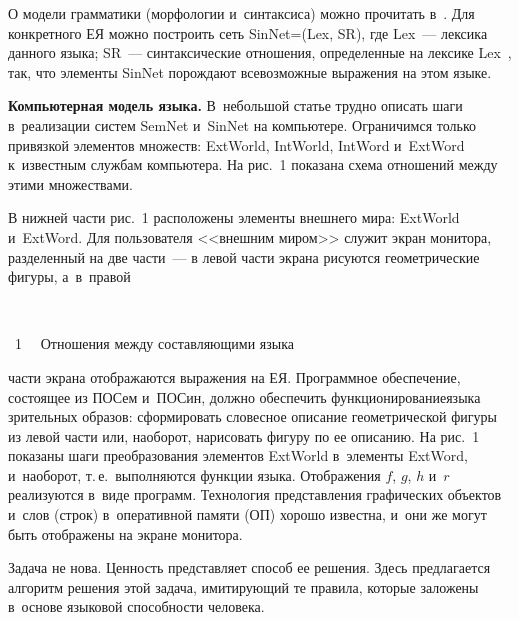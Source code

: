 \begin{multicols}{2}
  О модели грамматики (морфологии и~синтаксиса) можно прочитать 
в~\cite{2-sh, 5-sh}. Для конкретного ЕЯ можно по\-стро\-ить сеть 
SinNet\;=\;(Lex, SR), где Lex~--- лек\-си\-ка данного языка; SR~--- 
синтаксические отношения, определенные на лек\-си\-ке Lex~\cite{6-sh}, так, 
что элементы SinNet по\-рож\-да\-ют все\-воз\-мож\-ные выражения на этом языке. 
  
  \textbf{Компьютерная модель языка.} В~небольшой статье трудно 
описать шаги в~реализации систем SemNet и~SinNet на компьютере. 
Ограничимся только при\-вяз\-кой элементов множеств: ExtWorld, IntWorld, 
IntWord и~ExtWord к~известным служ\-бам компьютера. На рис.~1 показана 
схема отношений между этими множествами.


          
      
  В нижней части рис.~1 расположены элементы внеш\-не\-го мира: ExtWorld и~ExtWord. 
  Для пользователя <<внешним миром>> служит экран 
монитора, разделенный на две час\-ти~--- в левой час\-ти экрана рисуются 
геометрические фигуры, а~в~правой\linebreak\vspace*{-12pt}

{ \begin{center}  %
 \vspace*{12pt}
   \mbox{%
\epsfxsize=79mm
}

\vspace*{6pt}

\noindent
{{\figurename~1}\ \ \small{
Отношения между составляющими языка
}}
\end{center}
}

     
     
     \noindent
      час\-ти экрана отображаются 
выражения на ЕЯ. Про\-грам\-мное обеспечение, со\-сто\-ящее из \mbox{ПОСем} 
и~\mbox{ПОСин}, должно обеспечить функционирование\linebreak языка зрительных 
образов: сформировать словесное описание гео\-мет\-ри\-че\-ской фигуры из 
левой час\-ти или, наоборот, нарисовать фигуру по ее описанию. На рис.~1 
показаны шаги преобразования \mbox{элементов} ExtWorld в~элементы ExtWord, 
и~наоборот, т.\,е.\ выполняются функции языка. Отображения $f$, $g$, $h$ 
и~$r$ реализуются в~виде программ. Технология пред\-став\-ле\-ния 
графических объектов и~слов (строк) в~оперативной памяти (ОП) хорошо 
известна, и~они же могут быть отображены на экране монитора. 
  
  Задача не нова. Ценность представляет способ ее решения. Здесь 
предлагается алгоритм решения этой задача, ими\-ти\-ру\-ющий те правила, 
которые заложены в~основе языковой спо\-соб\-ности человека. 
  

\end{multicols}
